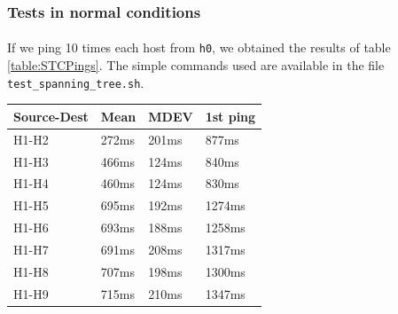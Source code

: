 \documentclass[a4paper, 11pt, oneside]{article}
\begin{document}
\begin{table}[H]
\subsubsection{Tests in normal conditions}
\paragraph{}If we ping 10 times each host from \texttt{h0}, we obtained the results of table \ref{table:STCPings}. The simple commands used are available in the file \texttt{test\_spanning\_tree.sh}.\\
\begin{table}[]
\centering
\begin{tabular}{|l|l|l|l|}
\hline
\multicolumn{1}{|c|}{\textbf{Source-Dest}} & \multicolumn{1}{c|}{\textbf{Mean}} & \multicolumn{1}{c|}{\textbf{MDEV}} & \multicolumn{1}{c|}{\textbf{1st ping}} \\ \hline
H1-H2                                      & 272ms                              & 201ms                              & 877ms                                 \\ \hline
H1-H3                                      & 466ms                              & 124ms                              & 840ms                                 \\ \hline
H1-H4                                      & 460ms                              & 124ms                              & 830ms                                 \\ \hline
H1-H5                                      & 695ms                              & 192ms                              & 1274ms                                 \\ \hline
H1-H6                                      & 693ms                              & 188ms                              & 1258ms                                 \\ \hline
H1-H7                                      & 691ms                              & 208ms                              & 1317ms                                 \\ \hline
H1-H8                                      & 707ms                              & 198ms                              & 1300ms                                 \\ \hline
H1-H9                                      & 715ms                              & 210ms                              & 1347ms                                 \\ \hline

\end{tabular}
\end{table}
\end{table}
\end{document}
